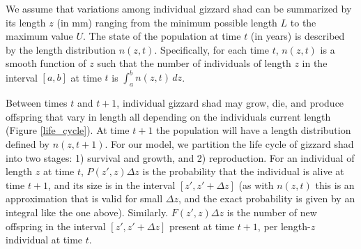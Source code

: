 \documentclass[preprint,review,12pt,authoryear]{elsarticle}
\def\ds{\displaystyle}
\begin{document}
We assume that variations among individual gizzard shad can be summarized by its length $z$ (in mm) ranging from the minimum possible length $L$ to the maximum value $U$. The state of the population at time $t$ (in years) is described by the length distribution $n(z,t)$. Specifically, for each time $t$, $n(z,t)$ is a smooth function of $z$ such that the number of individuals of length $z$ in the interval $[a,b]$ at time $t$ is $\ds \int_a^b n(z,t) \, dz$. 

Between times $t$ and $t+1$, individual gizzard shad may grow, die, and produce offspring that vary in length all depending on the individuals current length (Figure \ref{life_cycle}). At time $t+1$ the population will have a length distribution defined by $n(z, t+1)$. For our model, we partition the life cycle of gizzard shad into two stages: 1) survival and growth, and  2) reproduction. For an individual of length $z$ at time $t$, $P(z',z)\Delta z$ is the probability that the individual is alive at time $t+1$, and its size is in the interval $[z', z' + \Delta z]$ (as with $n(z,t)$ this is an approximation that is valid for small $\Delta z$, and the exact probability is given by an integral like the one above). Similarly. $F(z',z)\Delta z$ is the number of new offspring in the interval $[z', z' + \Delta z]$ present at time $t+1$, per length-$z$ individual at time $t$.
\end{document}
